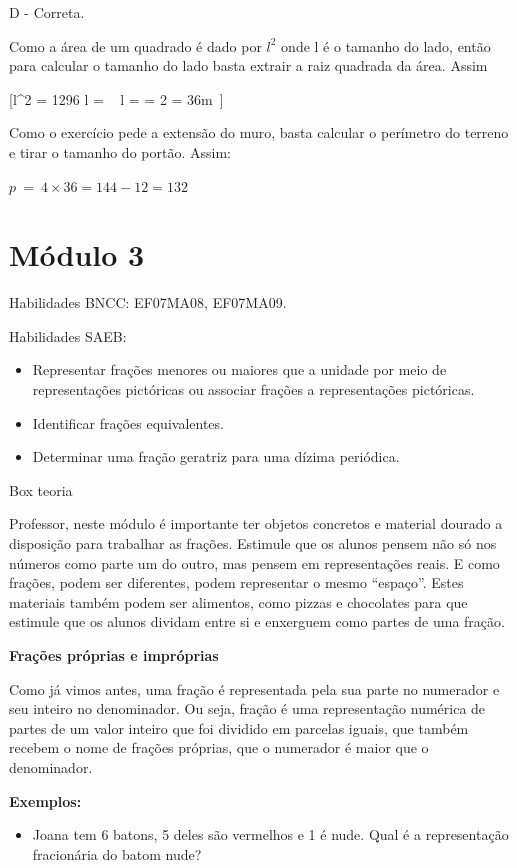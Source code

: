 D - Correta.

Como a área de um quadrado é dado por $l^2$ onde l é o tamanho do lado,
então para calcular o tamanho do lado basta extrair a raiz quadrada da
área. Assim

[l^{2} = 1296 \rightarrow l = \  \rightarrow l =  = 2    = 36m\ ]

Como o exercício pede a extensão do muro, basta calcular o perímetro do
terreno e tirar o tamanho do portão. Assim:

\(p\  = \ 4 \times 36 = 144 - 12 = 132\)

\section{Módulo 3}

Habilidades BNCC: EF07MA08, EF07MA09.

Habilidades SAEB:

\begin{itemize}
\item
  Representar frações menores ou maiores que a unidade por meio de
  representações pictóricas ou associar frações a representações
  pictóricas.
\item
  Identificar frações equivalentes.
\item
  Determinar uma fração geratriz para uma dízima periódica.
\end{itemize}

Box teoria

Professor, neste módulo é importante ter objetos concretos e material
dourado a disposição para trabalhar as frações. Estimule que os alunos
pensem não só nos números como parte um do outro, mas pensem em
representações reais. E como frações, podem ser diferentes, podem
representar o mesmo ``espaço''. Estes materiais também podem ser
alimentos, como pizzas e chocolates para que estimule que os alunos
dividam entre si e enxerguem como partes de uma fração.

\textbf{Frações próprias e impróprias}

Como já vimos antes, uma fração é representada pela sua parte no
numerador e seu inteiro no denominador. Ou seja, fração é uma
representação numérica de partes de um valor inteiro que foi dividido em
parcelas iguais, que também recebem o nome de frações próprias, que o
numerador é maior que o denominador.

\textbf{Exemplos:}

\begin{itemize}
\tightlist
\item
  Joana tem 6 batons, 5 deles são vermelhos e 1 é nude. Qual é a
  representação fracionária do batom nude?
\end{itemize}

